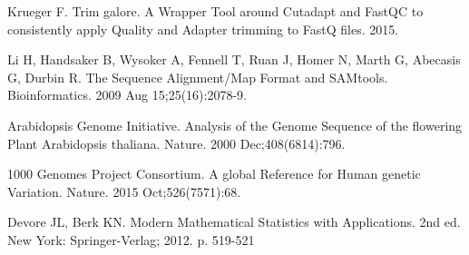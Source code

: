 \documentclass[10pt,letterpaper]{article}
\begin{document}
\begin{thebibliography}{10}
Krueger F. Trim galore. A Wrapper Tool around Cutadapt and FastQC to consistently apply Quality and Adapter trimming to FastQ files. 2015.

Li H, Handsaker B, Wysoker A, Fennell T, Ruan J, Homer N, Marth G, Abecasis G, Durbin R. 
The Sequence Alignment/Map Format and SAMtools. Bioinformatics. 2009 Aug 15;25(16):2078-9.

Arabidopsis Genome Initiative. Analysis of the Genome Sequence of the flowering Plant Arabidopsis thaliana. Nature. 2000 Dec;408(6814):796.

1000 Genomes Project Consortium. A global Reference for Human genetic Variation. Nature. 2015 Oct;526(7571):68.

  Devore JL, Berk KN. Modern Mathematical Statistics with Applications. 2nd ed.
  New York: Springer-Verlag; 2012. p. 519-521


\end{thebibliography}
\end{document}

